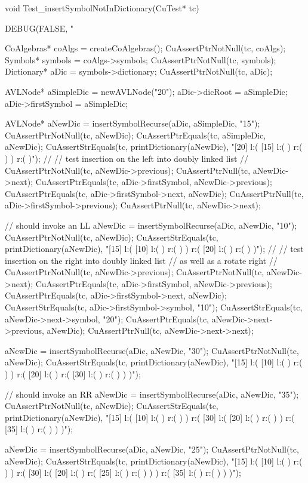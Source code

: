 void Test_insertSymbolNotInDictionary(CuTest* tc) {
  DEBUG(FALSE, "\n%

  CoAlgebras* coAlgs = createCoAlgebras();
  CuAssertPtrNotNull(tc, coAlgs);
  Symbols* symbols = coAlgs->symbols;
  CuAssertPtrNotNull(tc, symbols);
  Dictionary* aDic = symbols->dictionary;
  CuAssertPtrNotNull(tc, aDic);

  AVLNode* aSimpleDic = newAVLNode("20");
  aDic->dicRoot     = aSimpleDic;
  aDic->firstSymbol = aSimpleDic;

  AVLNode* aNewDic = insertSymbolRecurse(aDic, aSimpleDic, "15");
  CuAssertPtrNotNull(tc, aNewDic);
  CuAssertPtrEquals(tc, aSimpleDic, aNewDic);
  CuAssertStrEquals(tc, printDictionary(aNewDic),
  "[20] l:( [15] l:(  ) r:(  )  ) r:(  )");
  //
  // test insertion on the left into doubly linked list
  //
  CuAssertPtrNotNull(tc, aNewDic->previous);
  CuAssertPtrNull(tc, aNewDic->next);
  CuAssertPtrEquals(tc, aDic->firstSymbol, aNewDic->previous);
  CuAssertPtrEquals(tc, aDic->firstSymbol->next, aNewDic);
  CuAssertPtrNull(tc, aDic->firstSymbol->previous);
  CuAssertPtrNull(tc, aNewDic->next);

  // should invoke an LL
  aNewDic = insertSymbolRecurse(aDic, aNewDic, "10");
  CuAssertPtrNotNull(tc, aNewDic);
  CuAssertStrEquals(tc, printDictionary(aNewDic),
  "[15] l:( [10] l:(  ) r:(  )  ) r:( [20] l:(  ) r:(  )  )");
  //
  // test insertion on the right into doubly linked list
  // as well as a rotate right
  //
  CuAssertPtrNotNull(tc, aNewDic->previous);
  CuAssertPtrNotNull(tc, aNewDic->next);
  CuAssertPtrEquals(tc, aDic->firstSymbol, aNewDic->previous);
  CuAssertPtrEquals(tc, aDic->firstSymbol->next, aNewDic);
  CuAssertStrEquals(tc, aDic->firstSymbol->symbol, "10");
  CuAssertStrEquals(tc, aNewDic->next->symbol, "20");
  CuAssertPtrEquals(tc, aNewDic->next->previous, aNewDic);
  CuAssertPtrNull(tc, aNewDic->next->next);

  aNewDic = insertSymbolRecurse(aDic, aNewDic, "30");
  CuAssertPtrNotNull(tc, aNewDic);
  CuAssertStrEquals(tc, printDictionary(aNewDic),
  "[15] l:( [10] l:(  ) r:(  )  ) r:( [20] l:(  ) r:( [30] l:(  ) r:(  )  )  )");

  // should invoke an RR
  aNewDic = insertSymbolRecurse(aDic, aNewDic, "35");
  CuAssertPtrNotNull(tc, aNewDic);
  CuAssertStrEquals(tc, printDictionary(aNewDic),
  "[15] l:( [10] l:(  ) r:(  )  ) r:( [30] l:( [20] l:(  ) r:(  )  ) r:( [35] l:(  ) r:(  )  )  )");

  aNewDic = insertSymbolRecurse(aDic, aNewDic, "25");
  CuAssertPtrNotNull(tc, aNewDic);
  CuAssertStrEquals(tc, printDictionary(aNewDic),
  "[15] l:( [10] l:(  ) r:(  )  ) r:( [30] l:( [20] l:(  ) r:( [25] l:(  ) r:(  )  )  ) r:( [35] l:(  ) r:(  )  )  )");

}
